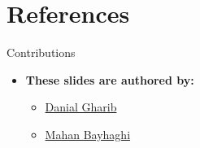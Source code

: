 \documentclass[serif, aspectratio=169]{beamer}
\begin{document}

\section{References}

\begin{frame}{Contributions}
\begin{itemize}
\item \textbf{These slides are authored by:}
\begin{itemize}
    \setlength{\itemsep}{10pt} %
    \item \href{https://github.com/Danial-Gharib}{Danial Gharib}
    \item \href{https://github.com/Mahan-Bayhaghi}{Mahan Bayhaghi}
\end{itemize}
\end{itemize}

\end{frame}

\begin{frame}[allowframebreaks]
    
    
    \nocite{*}
\end{frame}
\end{document}
